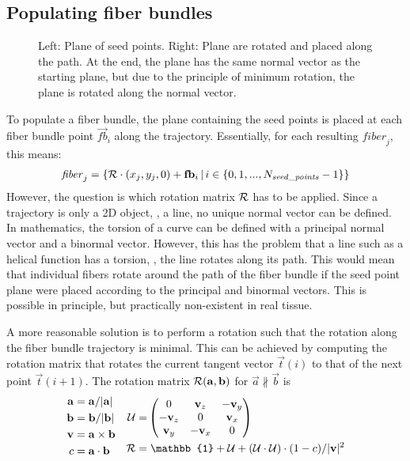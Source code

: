 \subsection{Populating fiber bundles}\label{sec:fillBundle}
%
\begin{figure}[!t]
    \centering
    \setlength{\tikzwidth}{0.75\textwidth}
	\caption{Left: Plane of seed points. Right: Plane are rotated and placed along the path. At the end, the plane has the same normal vector as the starting plane, but due to the principle of minimum rotation, the plane is rotated along the normal vector.}
	\label{fig:torsion}
\end{figure}
%
To populate a fiber bundle, the plane containing the seed points is placed at each fiber bundle point $\vec{fb}_i$ along the trajectory.
Essentially, for each resulting $\mathit{fiber}_j$, this means:
% 
\begin{align}
    \mathit{fiber}_j = \left\{ \mathcal{R} \cdot (x_j, y_j, 0) + \mathbf{fb}_i \, | \, i \in \{0,1,...,N_{\mathit{seed\_points}}-1\}\right\}
\end{align}
% 
However, the question is which rotation matrix $\mathcal{R}$ has to be applied.
Since a trajectory is only a 2D object, \ie{}, a line, no unique normal vector can be defined.
In mathematics, the torsion of a curve can be defined with a principal normal vector and a binormal vector.
However, this has the problem that a line such as a helical function has a torsion, \ie{}, the line rotates along its path.
This would mean that  individual fibers rotate around the path of the fiber bundle if the seed point plane were placed according to the principal and binormal vectors.
This is possible in principle, but practically non-existent in real tissue.
\par
% 
A more reasonable solution is to perform a rotation such that the rotation along the fiber bundle trajectory is minimal.
This can be achieved by computing the rotation matrix that rotates the current tangent vector $\vec{t}(i)$ to that of the next point $\vec{t}(i+1)$.
The rotation matrix $\mathcal{R}(\mathbf{a}, \mathbf{b})$ for $\vec{a} \nparallel \vec{b}$ is
\begin{align}
\begin{split}
    \vec{a} =& \; \vec{a} / |\vec{a}|\\
    \vec{b} =& \; \vec{b} / |\vec{b}|\\
    \vec{v} =& \; \vec{a} \times \vec{b}\\
    c =& \; \vec{a} \cdot \vec{b}
\end{split}
\quad
\begin{split}
    \mat{U} =& \begin{pmatrix} 0 & \vec{v}_z & -\vec{v}_y\\ -\vec{v}_z & 0 & \vec{v}_x\\ \vec{v}_y & -\vec{v}_x & 0\end{pmatrix}\\
    \mat{R} =& \; \mathbb{1} + \mat{U} + (\mat{U} \cdot \mat{U}) \cdot (1 - c) / |\vec{v}|^2
\end{split}
\end{align}
